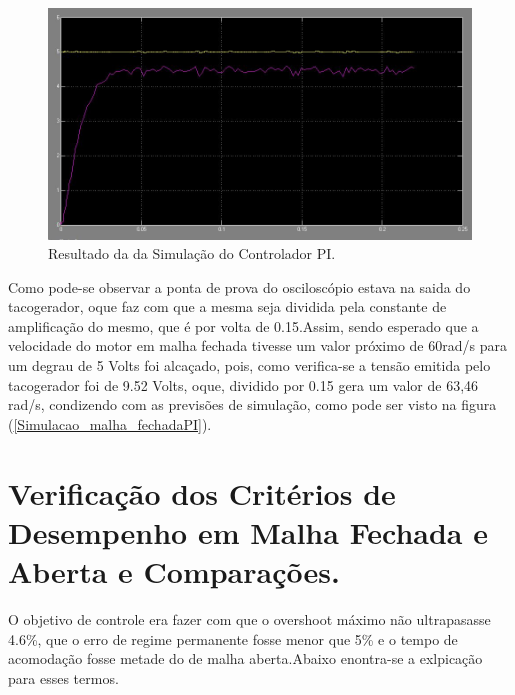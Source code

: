 \documentclass[11pt, a4paper, oneside]{article}
\begin{document}
\begin{figure}[h!]
\centering
\includegraphics[width=.9\linewidth]{simulacao_malha_fechada_osciloscopio.jpg}
\caption{Resultado da da Simulação do Controlador PI.}	
\label{malha_fechada_simulacao}
\end{figure}

Como pode-se observar a ponta de prova do osciloscópio estava na saida do tacogerador, oque faz com que a mesma seja dividida pela constante de amplificação do mesmo, que é por volta de 0.15.Assim, sendo esperado que a velocidade do motor em malha fechada tivesse um valor próximo de 60rad/s para um degrau de 5 Volts foi alcaçado, pois, como verifica-se a tensão emitida pelo tacogerador foi de 9.52 Volts, oque, dividido por 0.15 gera um valor de 63,46 rad/s, condizendo com as previsões de simulação, como pode ser visto na figura (\ref{Simulacao_malha_fechadaPI}).

 \section{Verificação dos Critérios de Desempenho em Malha Fechada e Aberta e Comparações.} 
 O objetivo de controle era fazer com que o overshoot máximo não ultrapasasse 4.6\%, que o erro de regime permanente fosse menor que 5\% e o tempo de acomodação fosse metade do de malha aberta.Abaixo enontra-se a exlpicação para esses termos.
\end{document}
